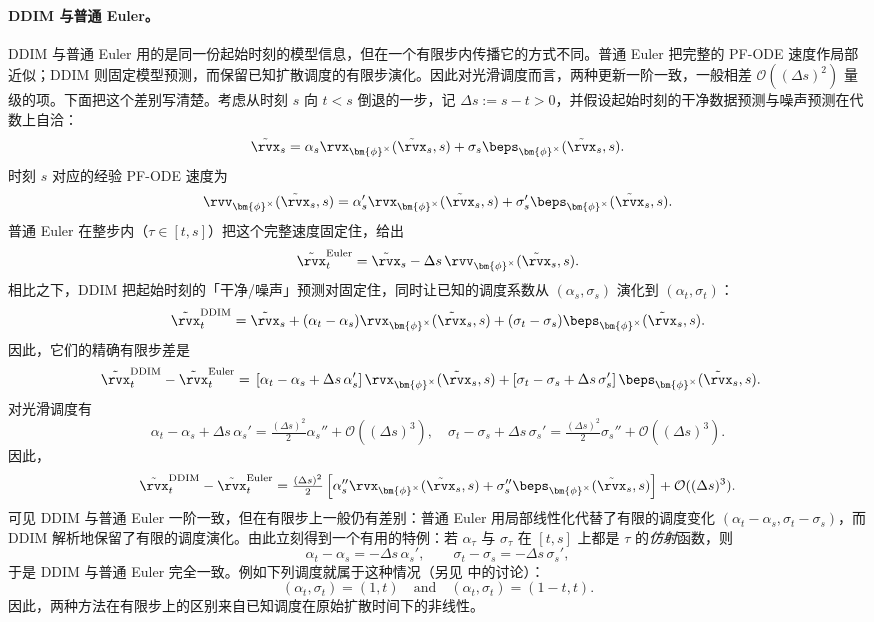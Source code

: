\paragraph{DDIM 与普通 Euler。}
DDIM 与普通 Euler 用的是同一份起始时刻的模型信息，但在一个有限步内传播它的方式不同。普通 Euler 把完整的 PF-ODE 速度作局部近似；DDIM 则固定模型预测，而保留已知扩散调度的有限步演化。因此对光滑调度而言，两种更新一阶一致，一般相差 $\mathcal O((\Delta s)^2)$ 量级的项。下面把这个差别写清楚。考虑从时刻 $s$ 向 $t<s$ 倒退的一步，记
$\Delta s:=s-t>0$，并假设起始时刻的干净数据预测与噪声预测在代数上自洽：
\[
\tilde\rvx_s
=
\alpha_s
\rvx_{\bm{\phi}^\times}(\tilde\rvx_s,s)
+
\sigma_s
\beps_{\bm{\phi}^\times}(\tilde\rvx_s,s).
\]
时刻 $s$ 对应的经验 PF-ODE 速度为
\[
\rvv_{\bm{\phi}^\times}(\tilde\rvx_s,s)
=
\alpha_s'
\rvx_{\bm{\phi}^\times}(\tilde\rvx_s,s)
+
\sigma_s'
\beps_{\bm{\phi}^\times}(\tilde\rvx_s,s).
\]
普通 Euler 在整步内（$\tau\in[t,s]$）把这个完整速度固定住，给出
\[
\tilde\rvx_t^{\mathrm{Euler}}
=
\tilde\rvx_s
-
\Delta s\,
\rvv_{\bm{\phi}^\times}(\tilde\rvx_s,s).
\]
相比之下，DDIM 把起始时刻的「干净/噪声」预测对固定住，同时让已知的调度系数从 $(\alpha_s,\sigma_s)$ 演化到 $(\alpha_t,\sigma_t)$：
\[
\tilde\rvx_t^{\mathrm{DDIM}}
=
\tilde\rvx_s
+
(\alpha_t-\alpha_s)
\rvx_{\bm{\phi}^\times}(\tilde\rvx_s,s)
+
(\sigma_t-\sigma_s)
\beps_{\bm{\phi}^\times}(\tilde\rvx_s,s).
\]
因此，它们的精确有限步差是
\begin{align*}
\tilde\rvx_t^{\mathrm{DDIM}}
-
\tilde\rvx_t^{\mathrm{Euler}}
={}&
\left[
\alpha_t-\alpha_s+\Delta s\,\alpha_s'
\right]
\rvx_{\bm{\phi}^\times}(\tilde\rvx_s,s)
+
\left[
\sigma_t-\sigma_s+\Delta s\,\sigma_s'
\right]
\beps_{\bm{\phi}^\times}(\tilde\rvx_s,s).
\end{align*}
对光滑调度有
\[
\alpha_t-\alpha_s+\Delta s\,\alpha_s'
=
\tfrac{(\Delta s)^2}{2}\alpha_s''
+
\mathcal O((\Delta s)^3), \quad
\sigma_t-\sigma_s+\Delta s\,\sigma_s'
=
\tfrac{(\Delta s)^2}{2}\sigma_s''
+
\mathcal O((\Delta s)^3).
\]
因此，
\begin{align*}
\tilde\rvx_t^{\mathrm{DDIM}}
-
\tilde\rvx_t^{\mathrm{Euler}}
=
\tfrac{(\Delta s)^2}{2}
\left[
\alpha_s''
\rvx_{\bm{\phi}^\times}(\tilde\rvx_s,s)
+
\sigma_s''
\beps_{\bm{\phi}^\times}(\tilde\rvx_s,s)
\right]
+
\mathcal O((\Delta s)^3).
\end{align*}
可见 DDIM 与普通 Euler 一阶一致，但在有限步上一般仍有差别：普通 Euler 用局部线性化代替了有限的调度变化 $(\alpha_t-\alpha_s,\sigma_t-\sigma_s)$，而 DDIM 解析地保留了有限的调度演化。由此立刻得到一个有用的特例：若 $\alpha_\tau$ 与 $\sigma_\tau$ 在 $[t,s]$ 上都是 $\tau$ 的\emph{仿射}函数，则
\[
\alpha_t-\alpha_s=-\Delta s\,\alpha_s',
\qquad
\sigma_t-\sigma_s=-\Delta s\,\sigma_s',
\]
于是 DDIM 与普通 Euler 完全一致。例如下列调度就属于这种情况（另见  中的讨论）：
\[(\alpha_t,\sigma_t)=(1,t)\quad \text{and}\quad (\alpha_t,\sigma_t)=(1-t,t) .
\]
因此，两种方法在有限步上的区别来自已知调度在原始扩散时间下的非线性。


